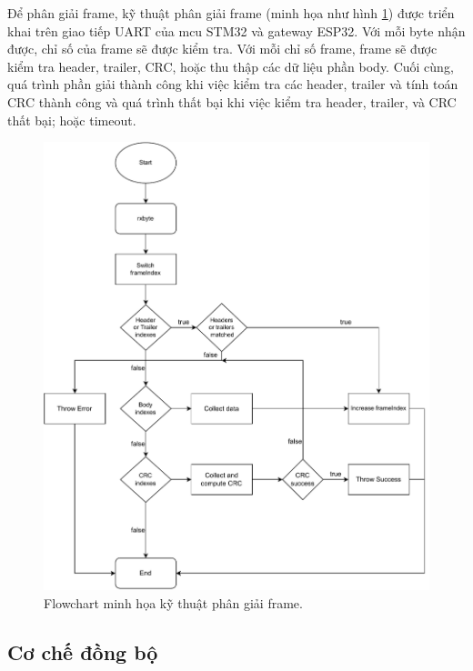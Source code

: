 
Để phân giải frame, kỹ thuật phân giải frame (minh họa như hình \ref{fig:frame-parsing-tech}) được triển khai trên giao tiếp UART của \acrshort{mcu} STM32 và gateway ESP32. Với mỗi byte nhận được, chỉ số của frame sẽ được kiểm tra. Với mỗi chỉ số frame, frame sẽ được kiểm tra header, trailer, CRC, hoặc thu thập các dữ liệu phần body. Cuối cùng, quá trình phần giải thành công khi việc kiểm tra các header, trailer và tính toán CRC thành công và quá trình thất bại khi việc kiểm tra header, trailer, và CRC thất bại; hoặc timeout.

\begin{figure}[htp]
\centering
\includegraphics[width=1.0\linewidth]{images/Thesis-Page-5-Frame-Parsing-Tech.pdf}
\caption{Flowchart minh họa kỹ thuật phân giải frame.}
\label{fig:frame-parsing-tech}
\end{figure}

\subsection{Cơ chế đồng bộ}
\label{VSync-Mecha}

